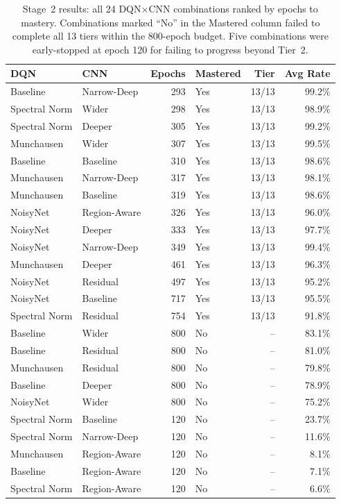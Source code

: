 \begin{table}[H]
  \centering
  \caption{Stage~2 results: all 24 DQN$\times$CNN combinations ranked by epochs to mastery. Combinations marked ``No'' in the Mastered column failed to complete all 13 tiers within the 800-epoch budget. Five combinations were early-stopped at epoch 120 for failing to progress beyond Tier~2.}
  \label{tab:res:cnn_summary}
  \begin{tabular}{@{} l l r l r r @{}}
    \toprule
    \textbf{DQN} & \textbf{CNN} & \textbf{Epochs} & \textbf{Mastered} & \textbf{Tier} & \textbf{Avg Rate} \\
    \midrule
    Baseline      & Narrow-Deep   & 293 & Yes & 13/13 & 99.2\% \\
    Spectral Norm & Wider         & 298 & Yes & 13/13 & 98.9\% \\
    Spectral Norm & Deeper        & 305 & Yes & 13/13 & 99.2\% \\
    Munchausen    & Wider         & 307 & Yes & 13/13 & 99.5\% \\
    Baseline      & Baseline      & 310 & Yes & 13/13 & 98.6\% \\
    Munchausen    & Narrow-Deep   & 317 & Yes & 13/13 & 98.1\% \\
    Munchausen    & Baseline      & 319 & Yes & 13/13 & 98.6\% \\
    NoisyNet      & Region-Aware  & 326 & Yes & 13/13 & 96.0\% \\
    NoisyNet      & Deeper        & 333 & Yes & 13/13 & 97.7\% \\
    NoisyNet      & Narrow-Deep   & 349 & Yes & 13/13 & 99.4\% \\
    Munchausen    & Deeper        & 461 & Yes & 13/13 & 96.3\% \\
    NoisyNet      & Residual      & 497 & Yes & 13/13 & 95.2\% \\
    NoisyNet      & Baseline      & 717 & Yes & 13/13 & 95.5\% \\
    Spectral Norm & Residual      & 754 & Yes & 13/13 & 91.8\% \\
    \midrule
    Baseline      & Wider         & 800 & No  & --    & 83.1\% \\
    Baseline      & Residual      & 800 & No  & --    & 81.0\% \\
    Munchausen    & Residual      & 800 & No  & --    & 79.8\% \\
    Baseline      & Deeper        & 800 & No  & --    & 78.9\% \\
    NoisyNet      & Wider         & 800 & No  & --    & 75.2\% \\
    Spectral Norm & Baseline      & 120 & No  & --    & 23.7\% \\
    Spectral Norm & Narrow-Deep   & 120 & No  & --    & 11.6\% \\
    Munchausen    & Region-Aware  & 120 & No  & --    & 8.1\%  \\
    Baseline      & Region-Aware  & 120 & No  & --    & 7.1\%  \\
    Spectral Norm & Region-Aware  & 120 & No  & --    & 6.6\%  \\
    \bottomrule
  \end{tabular}
\end{table}

